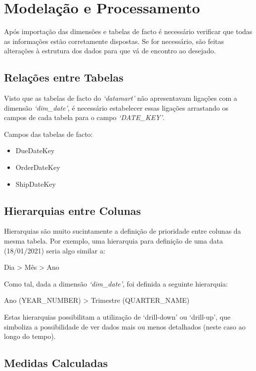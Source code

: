 \section*{Modelação e Processamento}
Após importação das dimensões e tabelas de facto é necessário verificar que todas as informações estão corretamente dispostas. Se for necessário, são feitas alterações à estrutura dos dados para que vá de encontro ao desejado.

\subsection{Relações entre Tabelas}
Visto que as tabelas de facto do \textit{`datamart'} não apresentavam ligações com a dimensão \textit{`dim\_date'}, é necessário estabelecer essas ligações arrastando os campos de cada tabela para o campo \textit{`DATE\_KEY'}.

Campos das tabelas de facto:
\begin{itemize}
    \renewcommand\labelitemi{--}
    \item DueDateKey
    \item OrderDateKey
    \item ShipDateKey
\end{itemize}

\subsection{Hierarquias entre Colunas}
Hierarquias são muito sucintamente a definição de prioridade entre colunas da mesma tabela.
Por exemplo, uma hierarquia para definição de uma data (18/01/2021) seria algo similar a:
\begin{center}
    Dia > Mês > Ano
\end{center}
\hsp Como tal, dada a dimensão \textit{`dim\_date'}, foi definida a seguinte hierarquia:
\begin{center}
    Ano (YEAR\_NUMBER) > Trimestre (QUARTER\_NAME)
\end{center}

Estas hierarquias possibilitam a utilização de `drill-down' ou `drill-up', que simboliza a possibilidade de ver dados mais ou menos detalhados (neste caso ao longo do tempo).

\subsection{Medidas Calculadas}


